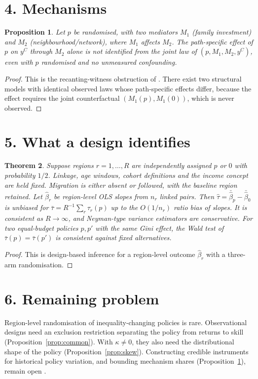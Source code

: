 \documentclass[11pt]{article}
\newtheorem{theorem}{Theorem}
\newtheorem{proposition}[theorem]{Proposition}
\theoremstyle{definition}
\begin{document}
\section*{4. Mechanisms}
\begin{proposition}\label{prop:mech}
Let $p$ be randomised, with two mediators $M_1$ (family investment) and $M_2$ (neighbourhood/network), where $M_1$ affects
$M_2$. The path-specific effect of $p$ on $y^C$ through $M_2$ alone is not identified from the joint law of
$(p,M_1,M_2,y^C)$, even with $p$ randomised and no unmeasured confounding.
\end{proposition}
\begin{proof}
This is the recanting-witness obstruction of \cite{asp}. There exist two structural models with identical observed laws
whose path-specific effects differ, because the effect requires the joint counterfactual $(M_1(p),M_1(0))$, which is never
observed.
\end{proof}

\section*{5. What a design identifies}
\begin{theorem}\label{thm:crt}
Suppose regions $r=1,\dots,R$ are independently assigned $p$ or $0$ with probability $1/2$. Linkage, age windows,
cohort definitions and the income concept are held fixed. Migration is either absent or followed, with the baseline region
retained. Let $\widehat\beta_r$ be region-level OLS slopes from $n_r$ linked pairs. Then
$\widehat\tau=\bar{\widehat\beta}_{p}-\bar{\widehat\beta}_0$ is unbiased for
$\bar\tau=R^{-1}\sum_r\tau_r(p)$ up to the $O(1/n_r)$ ratio bias of slopes. It is consistent as $R\to\infty$, and
Neyman-type variance estimators are conservative. For two equal-budget policies $p,p'$ with the same Gini effect, the
Wald test of $\bar\tau(p)=\bar\tau(p')$ is consistent against fixed alternatives.
\end{theorem}
\begin{proof}
This is design-based inference for a region-level outcome $\widehat\beta_r$ with a three-arm randomisation.
\end{proof}

\section*{6. Remaining problem}
Region-level randomisation of inequality-changing policies is rare. Observational designs need an exclusion
restriction separating the policy from returns to skill (Proposition~\ref{prop:common}). With $\kappa\neq0$, they also
need the distributional shape of the policy (Proposition~\ref{prop:skew}). Constructing credible instruments for
historical policy variation, and bounding mechanism shares (Proposition~\ref{prop:mech}), remain open \cite{dkt}.
\end{document}
